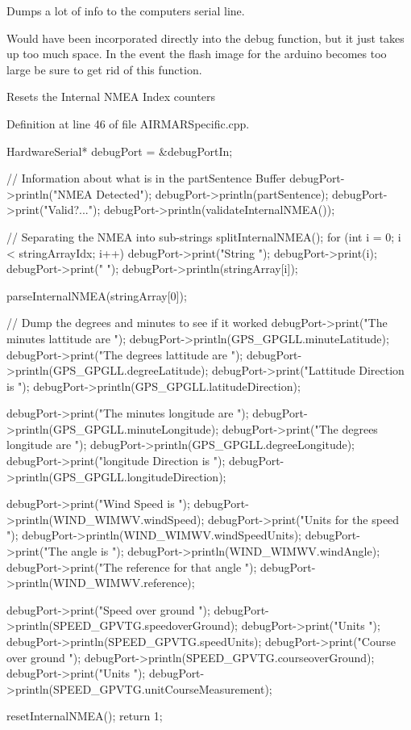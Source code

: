 \-Dumps a lot of info to the computers serial line. 

\-Would have been incorporated directly into the debug function, but it just takes up too much space. \-In the event the flash image for the arduino becomes too large be sure to get rid of this function.

\-Resets the \-Internal \-N\-M\-E\-A \-Index counters 

\-Definition at line 46 of file \-A\-I\-R\-M\-A\-R\-Specific.\-cpp.


\begin{DoxyCode}
                                                    {
    HardwareSerial* debugPort = &debugPortIn;

    // Information about what is in the partSentence Buffer
    debugPort->println("NMEA Detected");
    debugPort->println(partSentence);
    debugPort->print("Valid?...");
    debugPort->println(validateInternalNMEA());

    // Separating the NMEA into sub-strings
    splitInternalNMEA();
    for (int i = 0; i < stringArrayIdx; i++) {
        debugPort->print("String ");
        debugPort->print(i);
        debugPort->print(" ");
        debugPort->println(stringArray[i]);
    }

    parseInternalNMEA(stringArray[0]);

    // Dump the degrees and minutes to see if it worked
    debugPort->print("The minutes lattitude are ");
    debugPort->println(GPS_GPGLL.minuteLatitude);
    debugPort->print("The degrees lattitude are ");
    debugPort->println(GPS_GPGLL.degreeLatitude);
    debugPort->print("Lattitude Direction is ");
    debugPort->println(GPS_GPGLL.latitudeDirection);

    debugPort->print("The minutes longitude are ");
    debugPort->println(GPS_GPGLL.minuteLongitude);
    debugPort->print("The degrees longitude are ");
    debugPort->println(GPS_GPGLL.degreeLongitude);
    debugPort->print("longitude Direction is ");
    debugPort->println(GPS_GPGLL.longitudeDirection);

    debugPort->print("Wind Speed is ");
    debugPort->println(WIND_WIMWV.windSpeed);
    debugPort->print("Units for the speed ");
    debugPort->println(WIND_WIMWV.windSpeedUnits);
    debugPort->print("The angle is ");
    debugPort->println(WIND_WIMWV.windAngle);
    debugPort->print("The reference for that angle ");
    debugPort->println(WIND_WIMWV.reference);

    debugPort->print("Speed over ground ");
    debugPort->println(SPEED_GPVTG.speedoverGround);
    debugPort->print("Units ");
    debugPort->println(SPEED_GPVTG.speedUnits);
    debugPort->print("Course over ground ");
    debugPort->println(SPEED_GPVTG.courseoverGround);
    debugPort->print("Units ");
    debugPort->println(SPEED_GPVTG.unitCourseMeasurement);

    resetInternalNMEA();
    return 1;
}
\end{DoxyCode}
